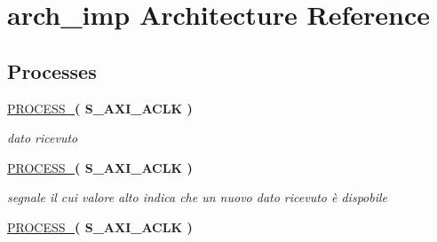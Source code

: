 \hypertarget{classUART__v1__0__S00__AXI_1_1arch__imp}{}\section{arch\+\_\+imp Architecture Reference}
\label{classUART__v1__0__S00__AXI_1_1arch__imp}
\subsection*{Processes}
 \begin{DoxyCompactItemize}
\item 
\mbox{\label{classUART__v1__0__S00__AXI_1_1arch__imp_a3bd49952c6361256b0fd16de71d09227}} 
\hyperlink{classUART__v1__0__S00__AXI_1_1arch__imp_a3bd49952c6361256b0fd16de71d09227}{P\+R\+O\+C\+E\+S\+S\+\_}{\bfseries  ( {\bfseries \textcolor{vhdlchar}{S\+\_\+\+A\+X\+I\+\_\+\+A\+C\+LK}\textcolor{vhdlchar}{ }} )}
\begin{DoxyCompactList}\small\item\em dato ricevuto \end{DoxyCompactList}\item 
\mbox{\label{classUART__v1__0__S00__AXI_1_1arch__imp_a8fbd1d135ff76bf9241c19565ede6f47}} 
\hyperlink{classUART__v1__0__S00__AXI_1_1arch__imp_a8fbd1d135ff76bf9241c19565ede6f47}{P\+R\+O\+C\+E\+S\+S\+\_}{\bfseries  ( {\bfseries \textcolor{vhdlchar}{S\+\_\+\+A\+X\+I\+\_\+\+A\+C\+LK}\textcolor{vhdlchar}{ }} )}
\begin{DoxyCompactList}\small\item\em segnale il cui valore alto indica che un nuovo dato ricevuto è dispobile \end{DoxyCompactList}\item 
\mbox{\label{classUART__v1__0__S00__AXI_1_1arch__imp_a86849bc293eedede60c3794d52db5cf2}} 
\hyperlink{classUART__v1__0__S00__AXI_1_1arch__imp_a86849bc293eedede60c3794d52db5cf2}{P\+R\+O\+C\+E\+S\+S\+\_}{\bfseries  ( {\bfseries \textcolor{vhdlchar}{S\+\_\+\+A\+X\+I\+\_\+\+A\+C\+LK}\textcolor{vhdlchar}{ }} )}
\item 
\mbox{\label{classUART__v1__0__S00__AXI_1_1arch__imp_acf9a8d423319c94928908546cd66d779}} 

\end{DoxyCompactItemize}
